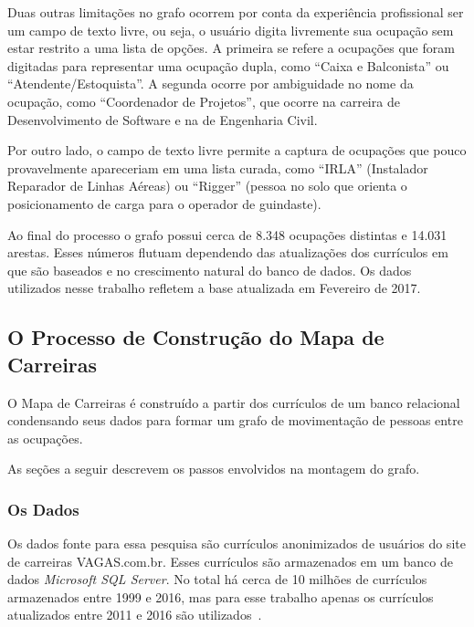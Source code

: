 \documentclass[12pt,a4paper]{article}
\theoremstyle{hypo}
\begin{document}
Duas outras limitações no grafo ocorrem por conta da experiência profissional ser um campo de texto livre, ou seja, o usuário digita livremente sua ocupação sem estar restrito a uma lista de opções. A primeira se refere a ocupações que foram digitadas para representar uma ocupação dupla, como \enquote{Caixa e Balconista} ou \enquote{Atendente/Estoquista}. A segunda ocorre por ambiguidade no nome da ocupação, como \enquote{Coordenador de Projetos}, que ocorre na carreira de Desenvolvimento de Software e na de Engenharia Civil.

Por outro lado, o campo de texto livre permite a captura de ocupações que pouco provavelmente apareceriam em uma lista curada, como \enquote{IRLA} (Instalador Reparador de Linhas Aéreas) ou \enquote{Rigger} (pessoa no solo que orienta o posicionamento de carga para o operador de guindaste).

Ao final do processo o grafo possui cerca de 8.348 ocupações distintas e 14.031 arestas. Esses números flutuam dependendo das atualizações dos currículos em que são baseados e no crescimento natural do banco de dados. Os dados utilizados nesse trabalho refletem a base atualizada em Fevereiro de 2017.


\subsection{O Processo de Construção do Mapa de Carreiras} \label{sec:construcao}

O Mapa de Carreiras é construído a partir dos currículos de um banco relacional condensando seus dados para formar um grafo de movimentação de pessoas entre as ocupações.

As seções a seguir descrevem os passos envolvidos na montagem do grafo.

\subsubsection{Os Dados}

Os dados fonte para essa pesquisa são currículos anonimizados de usuários do site de carreiras VAGAS.com.br. Esses currículos são armazenados em um banco de dados \textit{Microsoft SQL Server}. No total há cerca de 10 milhões de currículos~ armazenados entre 1999 e 2016, mas para esse trabalho apenas os currículos atualizados entre 2011 e 2016 são utilizados~.
\end{document}

